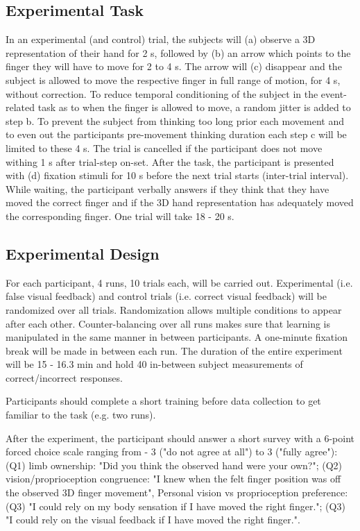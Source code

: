 \documentclass[man]{apa7}
\begin{document}
\subsection{Experimental Task}

In an experimental (and control) trial, the subjects will (a) observe a 3D representation of their hand for 2 s, followed by (b) an arrow which points to the finger they will have to move for 2 to 4 s. The arrow will (c) disappear and the subject is allowed to move the respective finger in full range of motion, for 4 s, without correction. To reduce temporal conditioning of the subject in the event-related task as to when the finger is allowed to move, a random jitter is added to step b. To prevent the subject from thinking too long prior each movement and to even out the participants pre-movement thinking duration each step c will be limited to these 4 s. The trial is cancelled if the participant does not move withing 1 s after trial-step on-set. After the task, the participant is presented with (d) fixation stimuli for 10 s before the next trial starts (inter-trial interval). While waiting, the participant verbally answers if they think that they have moved the correct finger and if the 3D hand representation has adequately moved the corresponding finger. One trial will take 18 - 20 s.

\subsection{Experimental Design}

For each participant, 4 runs, 10 trials each, will be carried out. Experimental (i.e. false visual feedback) and control trials (i.e. correct visual feedback) will be randomized over all trials. Randomization allows multiple conditions to appear after each other. Counter-balancing over all runs makes sure that learning is manipulated in the same manner in between participants. A one-minute fixation break will be made in between each run. The duration of the entire experiment will be 15 - 16.3 min and hold 40 in-between subject measurements of correct/incorrect responses.

Participants should complete a short training before data collection to get familiar to the task (e.g. two runs).

After the experiment, the participant should answer a short survey with a 6-point forced choice scale ranging from - 3 ("do not agree at all") to 3 ("fully agree"): (Q1) limb ownership: "Did you think the observed hand were your own?"; (Q2) vision/proprioception congruence: "I knew when the felt finger position was off the observed 3D finger movement", Personal vision vs proprioception preference: (Q3) "I could rely on my body sensation if I have moved the right finger."; (Q3) "I could rely on the visual feedback if I have moved the right finger.".
\end{document}
